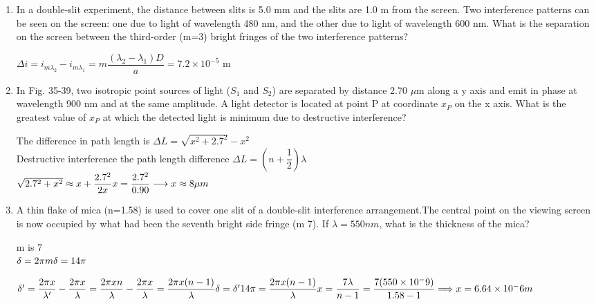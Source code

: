 \documentclass[fleqn]{article}
\begin{document}
\begin{enumerate}
    \item In a double-slit experiment, the distance between slits is 5.0 mm and the slits are 1.0 m from the screen. Two interference patterns can be seen on the screen: one due to light of wavelength 480 nm, and the other due to light of wavelength 600 nm. What is the separation on the screen between the third-order (m=3) bright fringes of the two interference patterns?

    \textcolor{hwColor}{
      $
        \Delta i=i_{m\lambda_2}-i_{m\lambda_1}=m\dfrac{(\lambda_2-\lambda_1)D}{a}=7.2\times 10^{-5} 
      $ m
    }

    \item In Fig. 35-39, two isotropic point sources of light ($S_1$ and $S_2$) are separated by distance 2.70 $\mu$m along a y axis and emit in phase at wavelength 900 nm and at the same amplitude. A light detector is located at point P at coordinate $x_P$ on the x axis. What is the greatest value of $x_P$ at which the detected light is minimum due to destructive interference?

    \textcolor{hwColor}{
      The difference in path length is $\Delta L=\sqrt{x^2+2.7^2}-x^2$ \\
      Destructive interference the path length difference $\Delta L=(n+\dfrac{1}{2})\lambda$ \\
      $
        \sqrt{2.7^2+x^2}\approx x+\dfrac{2.7^2}{2x} \\
        x=\dfrac{2.7^2}{0.90} \longrightarrow x\approx 8 \mu m
      $
    }

    \item A thin flake of mica (n=1.58) is used to cover one slit of a double-slit interference arrangement.The central point on the viewing screen is now occupied by what had been the seventh bright side fringe (m  7). If $\lambda=550 nm$, what is the thickness of the mica?

    \textcolor{hwColor}{
      m is 7 \\
      $
        \delta=2\pi m \\
        \delta=14\pi \\
      $
    }

    \textcolor{hwColor}{
      $
        \delta^\prime=\dfrac{2\pi x}{\lambda^\prime}-\dfrac{2\pi x}{\lambda}=\dfrac{2\pi xn}{\lambda}-\dfrac{2\pi x}{\lambda}=\dfrac{2\pi x(n-1)}{\lambda} \\
        \\
        \delta=\delta^\prime \\
        14\pi=\dfrac{2\pi x(n-1)}{\lambda} \\
        x=\dfrac{7\lambda}{n-1}=\dfrac{7(550 \times 10^-9)}{1.58-1} \Longrightarrow x=6.64 \times 10^-6 m
      $
    }


\end{enumerate}
\end{document}
